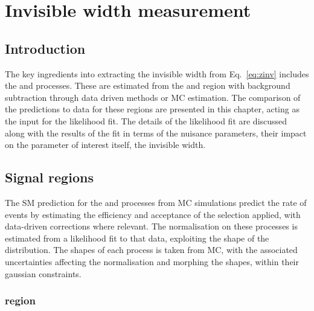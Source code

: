 \chapter{Invisible width measurement}
\label{chap:inv-width-extraction}


\section{Introduction}

The key ingredients into extracting the \PZ invisible width from Eq.~\ref{eq:zinv} includes the \IZvvj and \IZllj processes. These are estimated from the \metplusjets and \diellplusjets region with background subtraction through data driven methods or MC estimation. The comparison of the predictions to data for these regions are presented in this chapter, acting as the input for the likelihood fit. The details of the likelihood fit are discussed along with the results of the fit in terms of the nuisance parameters, their impact on the parameter of interest itself, the \PZ invisible width.


\section{Signal regions}

The SM prediction for the \IZvvj and \IZllj processes from MC simulations predict the rate of events by estimating the efficiency and acceptance of the selection applied, with data-driven corrections where relevant. The normalisation on these processes is estimated from a likelihood fit to that data, exploiting the shape of the \recoil distribution. The shapes of each process is taken from MC, with the associated uncertainties affecting the normalisation and morphing the shapes, within their gaussian constraints.


\subsection{\diellplusjets region}

